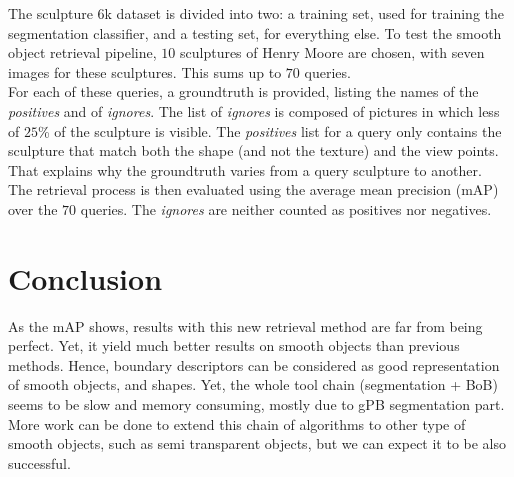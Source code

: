 \documentclass{article}
\begin{document}
The sculpture 6k dataset is divided into two: a training set, used for
training the segmentation classifier, and a testing set, for everything else.
To test the smooth object retrieval pipeline, $10$ sculptures of Henry Moore are
chosen, with seven images for these sculptures. This sums up to $70$ queries. \\
For each of these queries, a groundtruth is provided, listing the names of the
\textit{positives} and of \textit{ignores}. The list of \textit{ignores} is
composed of pictures in which less of $25$\% of the sculpture is visible. The
\textit{positives} list for a query only contains the sculpture that match
both the shape (and not the texture) and the view points. That explains why
the groundtruth varies from a query sculpture to another. \\
The retrieval process is then evaluated using the average mean precision (mAP)
over the $70$ queries. The \textit{ignores} are neither counted as positives nor
negatives.


\section{Conclusion}

As the mAP shows, results with this new retrieval method are far from being
perfect. Yet, it yield much better results on smooth objects than previous
methods. Hence, boundary descriptors can be considered as good representation
of smooth objects, and shapes. Yet, the whole tool chain (segmentation + BoB)
seems to be slow and memory consuming, mostly due to gPB segmentation part. \\
More work can be done to extend this chain of algorithms to other type of
smooth objects, such as semi transparent objects, but we can expect it to be
also successful. \\



\end{document}
